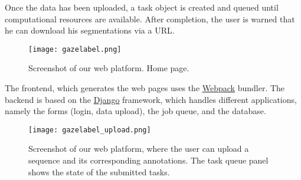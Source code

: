 Once the data has been uploaded, a task object is created and queued until computational resources are available.
After completion, the user is warned that he can download his segmentations via a URL.

\begin{figure}[!htpb]
  \texttt{[image: gazelabel.png]}
  \caption{Screenshot of our web platform. Home page.}
  \label{fig:homepage}
\end{figure}

The frontend, which generates the web pages uses the \href{https://webpack.js.org}{Webpack} bundler.
The backend is based on the \href{https://www.djangoproject.com/}{Django} framework, which handles different applications, namely the forms (login, data upload), the job queue, and the database.

\begin{figure}[!htpb]
  \texttt{[image: gazelabel\_upload.png]}
  \caption{Screenshot of our web platform, where the user can upload a sequence and its corresponding annotations. The task queue panel shows the state of the submitted tasks.}
  \label{fig:upload}
\end{figure}

